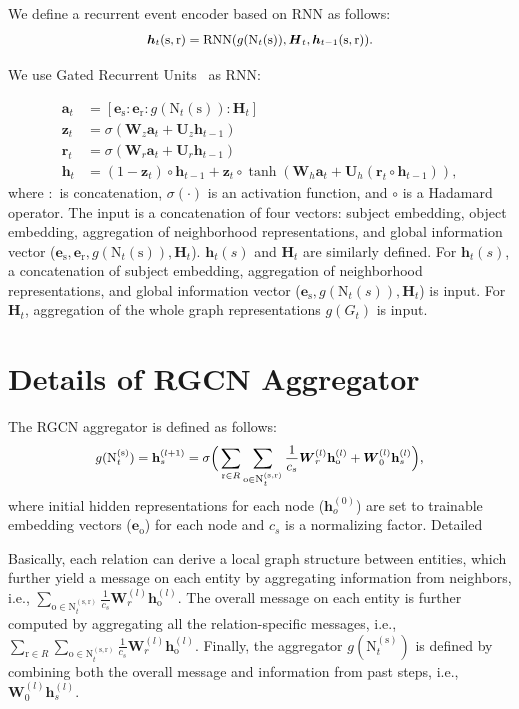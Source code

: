 \documentclass[11pt,a4paper]{article}
\newcommand{\bH}{\boldsymbol{H}}
\newcommand{\bh}{\boldsymbol{h}}
\newcommand{\bbh}{\mathbf{h}}
\newcommand{\bW}{\boldsymbol{W}}
\newcommand{\teN}{\text{N}}
\newcommand{\bs}{\mathrm{s}}
\newcommand{\br}{\mathrm{r}}
\newcommand{\bo}{\mathrm{o}}
\newcommand{\es}{\boldsymbol{e}_{\mathrm{s}}}
\newcommand{\er}{\boldsymbol{e}_{\mathrm{r}}}
\newcommand{\eo}{\boldsymbol{e}_{\mathrm{o}}}
\renewcommand{\bh}{\boldsymbol{h}}
\begin{document}
\label{append:eventseq}
We define a recurrent event encoder based on RNN as follows:
\begin{equation*}
	\small \bh_{t}(\bs,\br) = \textrm{RNN}(g(\teN_{t}(\bs)), \bH_t, \bh_{t-1}(\bs,\br)).
\end{equation*}

We use Gated Recurrent Units~\citep{Cho2014LearningPR} as RNN:

\small
\begin{align*}
    \boldsymbol{a}_{t} &= [\es: \er: g(\teN_{t}(\bs)): \bH_t]\\
    \boldsymbol{z}_t &= \sigma(\bW_z \boldsymbol{a}_{t} + \boldsymbol{U}_z \bh_{t-1})\\
    \boldsymbol{r}_t &= \sigma(\bW_r \boldsymbol{a}_{t} + \boldsymbol{U}_r \bh_{t-1})\\
    \bh_t &= (1-\boldsymbol{z}_t)\circ \bh_{t-1} + \boldsymbol{z}_t \circ \tanh(\bW_h \boldsymbol{a}_{t} + \boldsymbol{U}_h (\boldsymbol{r}_t \circ \bh_{t-1})),
\end{align*}
\normalsize
where $:$ is concatenation, $\sigma(\cdot)$ is an activation function, and $\circ$ is a Hadamard operator.
The input is a concatenation of four vectors: subject embedding, object embedding, aggregation of neighborhood representations, and global information vector ($\es, \er, g(\teN_{t}(\bs)), \bH_t$).
$\bh_t(s)$ and $\bH_t$ are similarly defined. For $\bh_t(s)$, a concatenation of subject embedding, aggregation of neighborhood representations, and global information vector ($\es, g(\teN_t(s)), \bH_t$) is input. For $\bH_t$, aggregation of the whole graph representations $g(G_t)$ is input.

\section{Details of RGCN Aggregator}
\label{sec:rgcn}
The RGCN aggregator is defined as follows:
\begin{equation}
\label{eq:rgcn}
    \small g(\teN^{(\bs)}_t)= \bbh_s^{(l+1)} = \sigma\Big(\sum_{\br\in R}\sum_{\bo \in \teN_t^{(\bs,\br)}} \frac{1}{c_s} \bW_r^{(l)} \bbh_\bo^{(l)} + \bW_0^{(l)} \bbh_s^{(l)}\Big), 
\end{equation}
where initial hidden representations for each node ($\bbh_o^{(0)}$) are set to trainable embedding vectors ($\eo$) for each node and $c_s$ is a normalizing factor. Detailed

Basically, each relation can derive a local graph structure between entities, which further yield a message on each entity by aggregating information from neighbors, i.e., {\small  $\sum_{\bo \in \teN_t^{(\bs,\br)}} \allowbreak \frac{1}{c_s} \bW_r^{(l)} \bbh_\bo^{(l)}$}. The overall message on each entity is further computed by aggregating all the relation-specific messages, i.e., {\small $\sum_{\br\in R}\sum_{\bo \in \teN_t^{(\bs,\br)}}\allowbreak \frac{1}{c_s} \bW_r^{(l)} \bbh_\bo^{(l)}$}. Finally, the aggregator {\small  $g(\teN^{(\bs)}_t)$} is defined by combining both the overall message and information from past steps, i.e., {\small $\bW_0^{(l)} \bbh_s^{(l)}$}.
\end{document}
